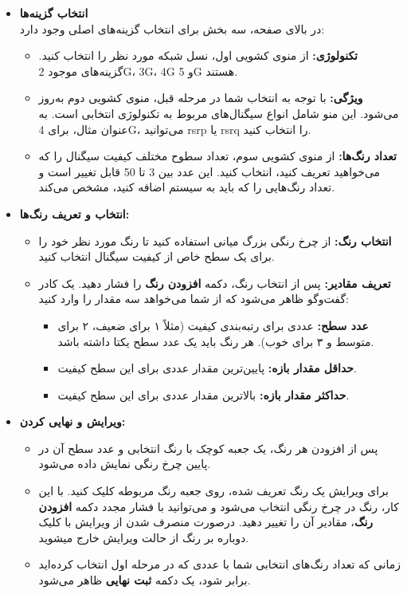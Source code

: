 \documentclass{report}
\begin{document}
\begin{itemize}
	\item \textbf{انتخاب گزینه‌ها} \\
	در بالای صفحه، سه بخش برای انتخاب گزینه‌های اصلی وجود دارد:
	
	\begin{itemize}
		\item \textbf{تکنولوژی:} از منوی کشویی اول، نسل شبکه مورد نظر را انتخاب کنید. گزینه‌های موجود 2G، 3G، 4G و 5G هستند.
		\item \textbf{ویژگی:} با توجه به انتخاب شما در مرحله قبل، منوی کشویی دوم به‌روز می‌شود. این منو شامل انواع سیگنال‌های مربوط به تکنولوژی انتخابی است. به عنوان مثال، برای 4G، می‌توانید rsrp یا rsrq را انتخاب کنید.
		\item \textbf{تعداد رنگ‌ها:} از منوی کشویی سوم، تعداد سطوح مختلف کیفیت سیگنال را که می‌خواهید تعریف کنید، انتخاب کنید. این عدد بین 3 تا 50 قابل تغییر است و تعداد رنگ‌هایی را که باید به سیستم اضافه کنید، مشخص می‌کند.
	\end{itemize}
	\item \textbf{انتخاب و تعریف رنگ‌ها:}
	\begin{itemize}
		\item \textbf{انتخاب رنگ:} از چرخ رنگی بزرگ میانی استفاده کنید تا رنگ مورد نظر خود را برای یک سطح خاص از کیفیت سیگنال انتخاب کنید.
		\item \textbf{تعریف مقادیر:} پس از انتخاب رنگ، دکمه \textbf{افزودن رنگ} را فشار دهید. یک کادر گفت‌وگو ظاهر می‌شود که از شما می‌خواهد سه مقدار را وارد کنید:
		\begin{itemize}
			\item \textbf{عدد سطح:} عددی برای رتبه‌بندی کیفیت (مثلاً ۱ برای ضعیف، ۲ برای متوسط و ۳ برای خوب). هر رنگ باید یک عدد سطح یکتا داشته باشد.
			\item \textbf{حداقل مقدار بازه:} پایین‌ترین مقدار عددی برای این سطح کیفیت.
			\item \textbf{حداکثر مقدار بازه:} بالاترین مقدار عددی برای این سطح کیفیت.
		\end{itemize}
	\end{itemize}

	\item \textbf{ویرایش و نهایی کردن:}
	\begin{itemize}
		\item پس از افزودن هر رنگ، یک جعبه کوچک با رنگ انتخابی و عدد سطح آن در پایین چرخ رنگی نمایش داده می‌شود.
		\item برای ویرایش یک رنگ تعریف شده، روی جعبه رنگ مربوطه کلیک کنید. با این کار، رنگ در چرخ رنگی انتخاب می‌شود و می‌توانید با فشار مجدد دکمه \textbf{افزودن رنگ}، مقادیر آن را تغییر دهید. درصورت منصرف شدن از ویرایش با کلیک دوباره بر رنگ از حالت ویرایش خارج میشوید.
		\item زمانی که تعداد رنگ‌های انتخابی شما با عددی که در مرحله اول انتخاب کرده‌اید برابر شود، یک دکمه \textbf{ثبت نهایی} ظاهر می‌شود.
	\end{itemize}
	
	
\end{itemize}
\end{document}
